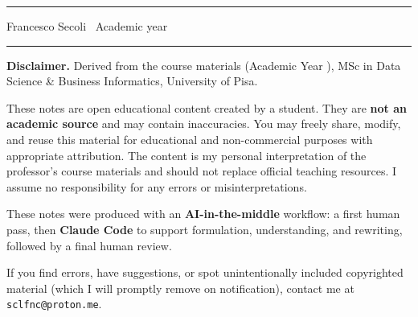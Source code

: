 \thispagestyle{empty}
\begin{center}
  {\color{rulegray}\rule{\linewidth}{0.8pt}}\par
  \vspace{0.8em}
  {\sffamily\bfseries\color{accent}\LARGE \coursetitle\par}
  \vspace{0.4em}
  {\sffamily\normalsize \coursesubtitle\par}
  \vspace{0.5em}
  {\normalsize Francesco Secoli \textbullet\ Academic year \courseyear\par}
  \vspace{0.6em}
  {\color{rulegray}\rule{\linewidth}{0.8pt}}\par
\end{center}

{\small\noindent
\textbf{\color{accent}Disclaimer.} Derived from the \emph{\coursetitle} course
materials (Academic Year \courseyear), MSc in Data Science \& Business
Informatics, University of Pisa.\par\smallskip
These notes are open educational content created by a student. They are \textbf{not
an academic source} and may contain inaccuracies. You may freely share, modify,
and reuse this material for educational and non-commercial purposes with
appropriate attribution. The content is my personal interpretation of the
professor's course materials and should not replace official teaching resources.
I assume no responsibility for any errors or misinterpretations.\par\smallskip
These notes were produced with an \textbf{AI-in-the-middle} workflow: a first
human pass, then \textbf{Claude Code} to support formulation, understanding, and
rewriting, followed by a final human review.\par\smallskip
If you find errors, have suggestions, or spot unintentionally included copyrighted
material (which I will promptly remove on notification), contact me at
\texttt{sclfnc@proton.me}.\par}
\newpage
\begingroup
  \renewcommand{\thispagestyle}[1]{}%
  \tableofcontents
\endgroup
\clearpage

\pagestyle{fancy}
\coursebody


